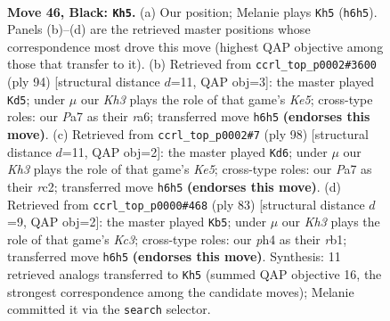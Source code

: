 \documentclass[11pt]{article}
\begin{document}
\clearpage

\begin{figure}[p]\centering
\begin{subfigure}{0.46\textwidth}\centering
\resizebox{\linewidth}{!}{%
\newchessgame
\chessboard[
  setfen={8/p2p4/2p4k/4K3/7P/3r4/5P2/8 b - - 0 46},
  showmover=false,
  pgfstyle=straightmove, color=movearrow, markmove={h6-h5}
]}
\caption{}
\end{subfigure}\hfill
\begin{subfigure}{0.46\textwidth}\centering
\resizebox{\linewidth}{!}{%
\newchessgame
\chessboard[
  setfen={3k4/7R/r5p1/2p1K1P1/7P/8/8/8 w - - 0 48},
  showmover=false,
  pgfstyle=straightmove, color=movearrow, markmove={e5-d5}
]}
\caption{}
\end{subfigure}
\\[4pt]
\begin{subfigure}{0.46\textwidth}\centering
\resizebox{\linewidth}{!}{%
\newchessgame
\chessboard[
  setfen={8/8/6k1/p3K3/1pP5/1P1R4/2r5/8 w - - 4 50},
  showmover=false,
  pgfstyle=straightmove, color=movearrow, markmove={e5-d6}
]}
\caption{}
\end{subfigure}\hfill
\begin{subfigure}{0.46\textwidth}\centering
\resizebox{\linewidth}{!}{%
\newchessgame
\chessboard[
  setfen={8/8/2k1p3/6rp/1P6/7K/5P2/1R6 b - - 5 42},
  showmover=false,
  pgfstyle=straightmove, color=movearrow, markmove={c6-b5}
]}
\caption{}
\end{subfigure}
\caption{\textbf{Move 46, Black: \texttt{Kh5}.} (a) Our position; Melanie plays \texttt{Kh5} (\texttt{h6h5}). Panels (b)--(d) are the retrieved master positions whose correspondence most drove this move (highest QAP objective among those that transfer to it). (b) Retrieved from \texttt{ccrl\_top\_p0002\#3600} (ply 94) [structural distance $d$=11, QAP obj=3]: the master played \texttt{Kd5}; under $\mu$ our \emph{Kh3} plays the role of that game's \emph{Ke5}; cross-type roles: our \emph{P}a7 as their \emph{r}a6; transferred move \texttt{h6h5} \textbf{(endorses this move)}. (c) Retrieved from \texttt{ccrl\_top\_p0002\#7} (ply 98) [structural distance $d$=11, QAP obj=2]: the master played \texttt{Kd6}; under $\mu$ our \emph{Kh3} plays the role of that game's \emph{Ke5}; cross-type roles: our \emph{P}a7 as their \emph{r}c2; transferred move \texttt{h6h5} \textbf{(endorses this move)}. (d) Retrieved from \texttt{ccrl\_top\_p0000\#468} (ply 83) [structural distance $d$=9, QAP obj=2]: the master played \texttt{Kb5}; under $\mu$ our \emph{Kh3} plays the role of that game's \emph{Kc3}; cross-type roles: our \emph{p}h4 as their \emph{r}b1; transferred move \texttt{h6h5} \textbf{(endorses this move)}. Synthesis: 11 retrieved analogs transferred to \texttt{Kh5} (summed QAP objective 16, the strongest correspondence among the candidate moves); Melanie committed it via the \texttt{search} selector.}
\label{fig:thought-m91}
\end{figure}
\end{document}
